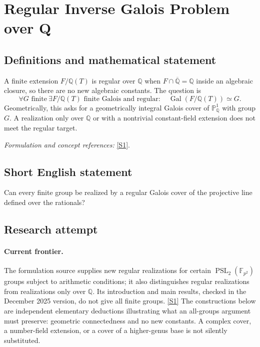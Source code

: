 \documentclass[11pt,a4paper]{article}
\newcommand{\Q}{\mathbb{Q}}
\newcommand{\F}{\mathbb{F}}
\newcommand{\PP}{\mathbb P}
\newcommand{\sref}[2]{\hyperlink{source:#1:#2}{[S#2]}}
\newif\ifshowcatalogue
\newcommand{\cataloguescope}[1]{\ifshowcatalogue
 \paragraph{Exact scope in the supplied catalogue.}
 \begin{quote}\small #1\end{quote}\fi}
\numberwithin{equation}{section}
\begin{document}
\setcounter{section}{0}
\clearpage
\section*{\texorpdfstring{Regular Inverse Galois Problem over Q}{Regular Inverse Galois Problem over Q}}\label{statement}
\subsection{Definitions and mathematical statement}
A finite extension $F/\Q(T)$ is regular over $\Q$ when $F\cap\overline{\Q}=\Q$ inside an algebraic closure, so there are no new algebraic constants. The question is
\[
 \forall G\text{ finite}\ \exists F/\Q(T)\text{ finite Galois and regular}:\quad
 \operatorname{Gal}(F/\Q(T))\simeq G.
\]
Geometrically, this asks for a geometrically integral Galois cover of $\PP^1_{\Q}$ with group $G$. A realization only over $\Q$ or with a nontrivial constant-field extension does not meet the regular target.
\par\smallskip\textit{Formulation and concept references:} \sref{statement}{1}.
\cataloguescope{For every finite group G, does there exist a finite Galois extension F/Q(T) with Gal(F/Q(T)) isomorphic to G and Q algebraically closed in F? Equivalently, require a geometrically integral Galois cover of the projective line over Q with group G. A positive resolution proves this for all finite groups; a negative resolution proves nonexistence for at least one finite group.}
\subsection{Short English statement}
Can every finite group be realized by a regular Galois cover of the projective line defined over the rationals?
\subsection{Research attempt}

\paragraph{Current frontier.}
The formulation source supplies new regular realizations for certain
$\operatorname{PSL}_2(\F_{p^2})$ groups subject to arithmetic conditions;
it also distinguishes regular realizations from realizations only over
$\Q$.  Its introduction and main results, checked in the December 2025
version, do not give all finite groups. \sref{statement}{1}
The constructions below are independent elementary deductions illustrating
what an all-groups argument must preserve: geometric connectedness and
no new constants.  A complex cover, a number-field extension, or a cover
of a higher-genus base is not silently substituted.
\end{document}
